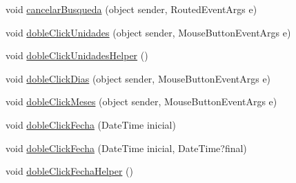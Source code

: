\begin{DoxyCompactItemize}
\item 
void \hyperlink{class_proyecto___integrador__3_1_1_reportes_1_1_reporte_frecuencia_de_uso_afa88104f4465581dd82871abd5e45355}{cancelar\-Busqueda} (object sender, Routed\-Event\-Args e)
\item 
void \hyperlink{class_proyecto___integrador__3_1_1_reportes_1_1_reporte_frecuencia_de_uso_a85f2c2307781a5f965e7785e2ad097c9}{doble\-Click\-Unidades} (object sender, Mouse\-Button\-Event\-Args e)
\item 
void \hyperlink{class_proyecto___integrador__3_1_1_reportes_1_1_reporte_frecuencia_de_uso_ad45d4ac134e025ecf247e9cdb642b4dd}{doble\-Click\-Unidades\-Helper} ()
\item 
void \hyperlink{class_proyecto___integrador__3_1_1_reportes_1_1_reporte_frecuencia_de_uso_a2ab966196c9bc681df237775e5084d8d}{doble\-Click\-Dias} (object sender, Mouse\-Button\-Event\-Args e)
\item 
void \hyperlink{class_proyecto___integrador__3_1_1_reportes_1_1_reporte_frecuencia_de_uso_a50be2c40af6717361795d2ca8e9b6bf3}{doble\-Click\-Meses} (object sender, Mouse\-Button\-Event\-Args e)
\item 
void \hyperlink{class_proyecto___integrador__3_1_1_reportes_1_1_reporte_frecuencia_de_uso_a416028f36197f7e057f32eadbf7b1eb5}{doble\-Click\-Fecha} (Date\-Time inicial)
\item 
void \hyperlink{class_proyecto___integrador__3_1_1_reportes_1_1_reporte_frecuencia_de_uso_a1121f3333a68a74dedb08e99da228d6f}{doble\-Click\-Fecha} (Date\-Time inicial, Date\-Time?final)
\item 
void \hyperlink{class_proyecto___integrador__3_1_1_reportes_1_1_reporte_frecuencia_de_uso_a59f59be488ca78728ed46771cf691b7b}{doble\-Click\-Fecha\-Helper} ()
\end{DoxyCompactItemize}
